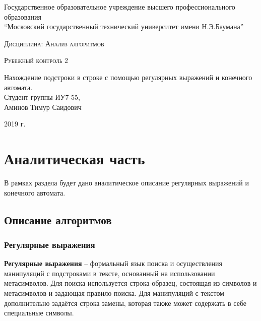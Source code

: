 \documentclass[a4paper, 14pt]{article}
\begin{document}
    \begin{titlepage}

        \begin{center}
            \large
            Государственное образовательное учреждение высшего профессионального образования\\
            “Московский государственный технический университет имени Н.Э.Баумана”
            \vspace{3cm}
            
            \textsc{Дисциплина: Анализ алгоритмов}
            \vspace{0.5cm}
                
            \textsc{Рубежный контроль 2}
            \vspace{1.5cm}
            
            {\LARGE Нахождение подстроки в строке с помощью регулярных выражений и конечного автомата.\\}
            \vspace{1.5cm}
            Студент группы ИУ7-55,\\   
            Аминов Тимур Саидович
            \vfill
            
            2019 г.
            
            \end{center}

    \end{titlepage}
    \setcounter{page}{2}

	
	\newpage       

        \label{sec:intro}

    	\newpage
        \section{Аналитическая часть}
		\parindent=1cm
		
		В рамках раздела будет дано аналитическое описание регулярных выражений и конечного автомата.
		

        \subsection{Описание алгоритмов}
        	\subsubsection{Регулярные выражения}
        
		\textbf{Регулярные выражения} – формальный язык поиска и осуществления манипуляций с подстроками в тексте, основанный на использовании метасимволов. Для поиска используется строка-образец, состоящая из символов и метасимволов и задающая правило поиска. Для манипуляций с текстом дополнительно задаётся строка замены, которая также может содержать в себе специальные символы.\\
\end{document}

